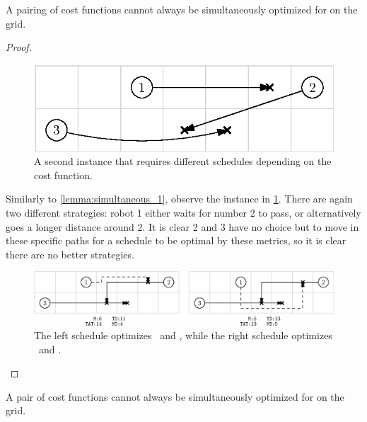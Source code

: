 \begin{lemma}\label{lemma:simultaneous_2}
	A pairing of cost functions  cannot always be simultaneously optimized for on the grid. 
\end{lemma}

\begin{proof}
	\begin{figure}[h]
		\centering
		\includegraphics[width=0.45\linewidth]{ipe/sim2_problem.eps}
		\caption{
			A second instance that requires different schedules depending on the cost function.
		}
		\label{fig:sim2}
	\end{figure}

	Similarly to \cref{lemma:simultaneous_1}, observe the instance in \cref{fig:sim2}. There are again two different strategies: robot 1 either waits for number 2 to pass, or alternatively goes a longer distance around 2. It is clear 2 and 3 have no choice but to move in these specific paths for a schedule to be optimal by these metrics, so it is clear there are no better strategies.

	\begin{figure}[h]
		\centering
		\includegraphics[width=\linewidth]{ipe/sim2_strat.eps}
		\caption{
			The left schedule optimizes \ and , while the right schedule optimizes \ and .
		}
		\label{fig:sim2_strat}
	\end{figure}
\end{proof}

\begin{theorem}
	A pair of cost functions  cannot always be simultaneously optimized for on the grid. 
\end{theorem}

